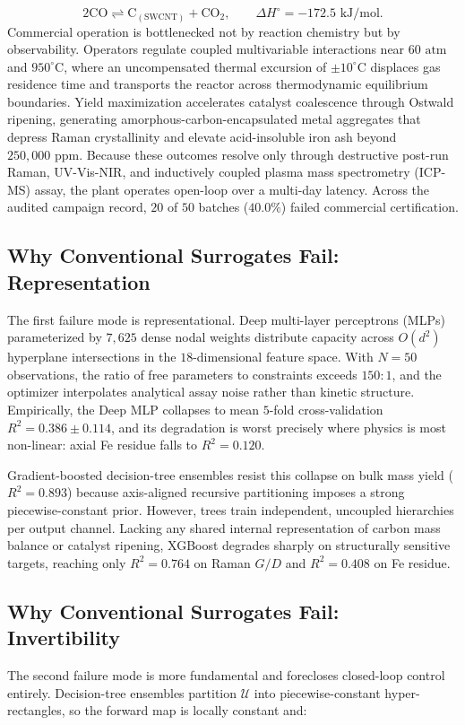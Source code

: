\documentclass[10pt,journal,onecolumn]{IEEEtran}
\begin{document}
\begin{equation}
2\text{CO} \rightleftharpoons \text{C}_{(\text{SWCNT})} + \text{CO}_2, \qquad \Delta H^\circ = -172.5\text{ kJ/mol}.
\end{equation}
Commercial operation is bottlenecked not by reaction chemistry but by observability. Operators regulate coupled multivariable interactions near $60\text{ atm}$ and $950^\circ\text{C}$, where an uncompensated thermal excursion of $\pm 10^\circ\text{C}$ displaces gas residence time and transports the reactor across thermodynamic equilibrium boundaries. Yield maximization accelerates catalyst coalescence through Ostwald ripening, generating amorphous-carbon-encapsulated metal aggregates that depress Raman crystallinity and elevate acid-insoluble iron ash beyond $250,000\text{ ppm}$. Because these outcomes resolve only through destructive post-run Raman, UV-Vis-NIR, and inductively coupled plasma mass spectrometry (ICP-MS) assay, the plant operates open-loop over a multi-day latency. Across the audited campaign record, $20$ of $50$ batches ($40.0\%$) failed commercial certification.

\subsection{Why Conventional Surrogates Fail: Representation}
The first failure mode is representational. Deep multi-layer perceptrons (MLPs) parameterized by $7,625$ dense nodal weights distribute capacity across $O(d^2)$ hyperplane intersections in the $18$-dimensional feature space. With $N = 50$ observations, the ratio of free parameters to constraints exceeds $150 : 1$, and the optimizer interpolates analytical assay noise rather than kinetic structure. Empirically, the Deep MLP collapses to mean $5$-fold cross-validation $R^2 = 0.386 \pm 0.114$, and its degradation is worst precisely where physics is most non-linear: axial Fe residue falls to $R^2 = 0.120$.

Gradient-boosted decision-tree ensembles resist this collapse on bulk mass yield ($R^2 = 0.893$) because axis-aligned recursive partitioning imposes a strong piecewise-constant prior. However, trees train independent, uncoupled hierarchies per output channel. Lacking any shared internal representation of carbon mass balance or catalyst ripening, XGBoost degrades sharply on structurally sensitive targets, reaching only $R^2 = 0.764$ on Raman $G/D$ and $R^2 = 0.408$ on Fe residue.

\subsection{Why Conventional Surrogates Fail: Invertibility}
The second failure mode is more fundamental and forecloses closed-loop control entirely. Decision-tree ensembles partition $\mathcal{U}$ into piecewise-constant hyper-rectangles, so the forward map is locally constant and:
\end{document}
